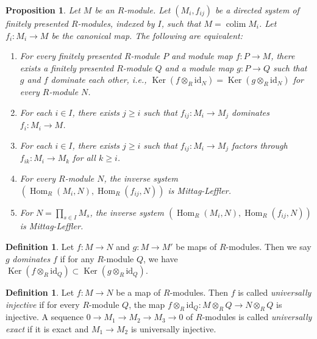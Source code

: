 \documentclass{amsart}
\theoremstyle{plain}
\newtheorem{proposition}[subsection]{Proposition}
\theoremstyle{definition}
\newtheorem{definition}[subsection]{Definition}
\theoremstyle{remark}
\numberwithin{equation}{subsection}
\def\colim{\mathop{\mathrm{colim}}\nolimits}
\def\Hom{\mathop{\mathrm{Hom}}\nolimits}
\def\Ker{\mathop{\mathrm{Ker}}}
\begin{document}
\begin{proposition}
\label{algebra-proposition-ML-characterization}
Let $M$ be an $R$-module.  Let $(M_i, f_{ij})$ be a directed system of finitely
presented $R$-modules, indexed by $I$, such that $M = \colim M_i$.  Let
$f_i:
M_i \to M$ be the canonical map.  The following are equivalent:
\begin{enumerate}
\item For every finitely presented $R$-module $P$ and module map $f: P
\to M$, there exists a finitely presented $R$-module $Q$ and a module
map $g: P \to Q$ such that $g$ and $f$ dominate each other, i.e.,
$\Ker(f \otimes_R \text{id}_N) = \Ker(g \otimes_R \text{id}_N)$
for every $R$-module $N$.
\item For each $i \in I$, there exists $j \geq i$ such that $f_{ij}: M_i
\to M_j$ dominates $f_i: M_i \to M$.
\item For each $i \in I$, there exists $j \geq i$ such that $f_{ij}: M_i
\to M_j$ factors through $f_{ik}: M_i \to M_k$ for all $k \geq
i$.
\item For every $R$-module $N$, the inverse system
$(\Hom_R(M_i, N), \Hom_R(f_{ij}, N))$ is Mittag-Leffler.
\item For $N = \prod_{s \in I} M_s$, the inverse system
$(\Hom_R(M_i, N), \Hom_R(f_{ij}, N))$ is Mittag-Leffler.
\end{enumerate}
\end{proposition}

\begin{definition}
\label{algebra-definition-domination}
Let $f: M \to N$ and $g: M \to M'$ be maps of $R$-modules.
Then we say $g$ {\it dominates} $f$ if for any $R$-module $Q$, we have $\Ker(f
\otimes_R \text{id}_Q) \subset \Ker(g \otimes_R \text{id}_Q)$.
\end{definition}

\begin{definition}
\label{algebra-definition-universally-injective}
Let $f: M \to N$ be a map of $R$-modules.  Then $f$ is called
{\it universally injective} if for every $R$-module $Q$, the map $f
\otimes_R \text{id}_Q: M \otimes_R Q \to N \otimes_R Q$
is injective.  A sequence $0 \to M_1 \to M_2 \to M_3
\to 0$ of $R$-modules is called {\it universally exact} if it is exact
and $M_1 \to M_2$ is universally injective.
\end{definition}
\end{document}
